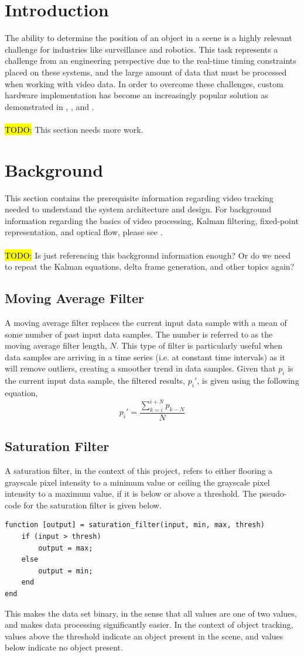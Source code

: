 \documentclass[11pt]{article} %
\begin{document}
\section{Introduction}
The ability to determine the position of an object in a scene is a highly relevant challenge for industries like surveillance and robotics. This task represents a challenge from an engineering perspective due to the real-time timing constraints placed on these systems, and the large amount of data that must be processed when working with video data. In order to overcome these challenges, custom hardware implementation has become an increasingly popular solution as demonstrated in \cite{1}, \cite{2}, and \cite{3}. \\\\
\hl{TODO:} This section needs more work.
\section{Background}
This section contains the prerequisite information regarding video tracking needed to understand the system architecture and design. For background information regarding the basics of video processing, Kalman filtering, fixed-point representation, and optical flow, please see \cite{15}. \\\\
\hl{TODO:} Is just referencing this background information enough? Or do we need to repeat the Kalman equations, delta frame generation, and other topics again?
\subsection{Moving Average Filter}
A moving average filter replaces the current input data sample with a mean of some number of past input data samples. The number is referred to as the moving average filter length, $N$. This type of filter is particularly useful when data samples are arriving in a time series (i.e. at constant time intervals) as it will remove outliers, creating a smoother trend in data samples. Given that $p_i$ is the current input data sample, the filtered results, $p_i'$, is given using the following equation,
\begin{equation}
p_i' = \frac{\sum_{k = i}^{i + N} p_{k-N}}{N}
\end{equation}
\subsection{Saturation Filter}
A saturation filter, in the context of this project, refers to either flooring a grayscale pixel intensity to a minimum value or ceiling the grayscale pixel intensity to a maximum value, if it is below or above a threshold. The pseudo-code for the saturation filter is given below.
\begin{lstlisting}
function [output] = saturation_filter(input, min, max, thresh)
	if (input > thresh)
		output = max;
	else
		output = min;
	end
end
\end{lstlisting} 
This makes the data set binary, in the sense that all values are one of two values, and makes data processing significantly easier. In the context of object tracking, values above the threshold indicate an object present in the scene, and values below indicate no object present.
\end{document}
